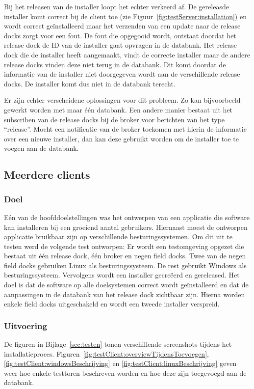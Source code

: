 Bij het releasen van de installer loopt het echter verkeerd af.
De gereleasde installer komt correct bij de client toe (zie Figuur~\ref{fig:testServer:installation}) en wordt correct geïnstalleerd  maar het verzenden van een update naar de release docks zorgt voor een fout.
De fout die opgegooid wordt, ontstaat doordat het release dock de ID van de installer gaat opvragen in de databank.
Het release dock die de installer heeft aangemaakt, vindt de correcte installer maar de andere release docks vinden deze niet terug in de databank.
Dit komt doordat de informatie van de installer niet doorgegeven wordt aan de verschillende release docks.
De installer komt dus niet in de databank terecht.

Er zijn echter verscheidene oplossingen voor dit probleem.
Zo kan bijvoorbeeld gewerkt worden met maar één databank.
Een andere manier bestaat uit het subscriben van de release docks bij de broker voor berichten van het type ``release''.
Mocht een notificatie van de broker toekomen met hierin de informatie over een nieuwe installer, dan kan deze gebruikt worden om de installer toe te voegen aan de databank.

\subsection{Meerdere clients}
\subsubsection{Doel}
Eén van de hoofddoelstellingen was het ontwerpen van een applicatie die software kan installeren bij een groeiend aantal gebruikers.
Hiernaast moest de ontworpen applicatie bruikbaar zijn op verschillende besturingssystemen.
Om dit uit te testen werd de volgende test ontworpen:
Er wordt een testomgeving opgezet die bestaat uit één release dock, één broker en negen field docks.
Twee van de negen field docks gebruiken Linux als besturingssysteem.
De rest gebruikt Windows als besturingssysteem.
Vervolgens wordt een installer gecreëerd en gereleased.
Het doel is dat de software op alle doelsystemen correct wordt geïnstalleerd en dat de aanpassingen in de databank van het release dock zichtbaar zijn.
Hierna worden enkele field docks uitgeschakeld en wordt een tweede installer verspreid.

\subsubsection{Uitvoering}
De figuren in Bijlage~\ref{sec:testen} tonen verschillende screenshots tijdens het installatieproces.
Figuren~\ref{fig:testClient:overviewTijdensToevoegen}, \ref{fig:testClient:windowsBeschrijving} en \ref{fig:testClient:linuxBeschrijving} geven weer hoe enkele testtoren beschreven worden en hoe deze zijn toegevoegd aan de databank.


